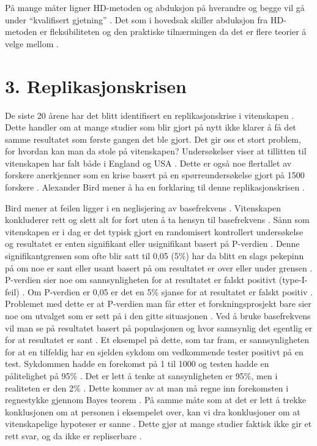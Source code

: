 \documentclass[
]{book}
\begin{document}
På mange måter ligner HD-metoden og abduksjon på hverandre og begge vil gå under ``kvalifisert gjetning'' \citep{persson2019}. Det som i hovedsak skiller abduksjon fra HD-metoden er fleksibiliteten og den praktiske tilnærmingen da det er flere teorier å velge mellom \citep{peirce1992}.

\hypertarget{replikasjonskrisen}{%
\section{3. Replikasjonskrisen}\label{replikasjonskrisen}}

De siste 20 årene har det blitt identifisert en replikasjonskrise i vitenskapen \citep{begley2012, ioannidis2005, opensciencecollaboration2015}. Dette handler om at mange studier som blir gjort på nytt ikke klarer å få det samme resultatet som første gangen det ble gjort. Det gir oss et stort problem, for hvordan kan man da stole på vitenskapen? Undersøkelser viser at tillitten til vitenskapen har falt både i England og USA \citep{funk2016}. Dette er også noe flertallet av forskere anerkjenner som en krise basert på en spørreundersøkelse gjort på 1500 forskere \citep{baker2016}. Alexander Bird mener å ha en forklaring til denne replikasjonskrisen \citep{bird2020}.

Bird mener at feilen ligger i en neglisjering av basefrekvens \citep{bird2020}. Vitenskapen konkluderer rett og slett alt for fort uten å ta hensyn til basefrekvens \citep{bird2020}. Sånn som vitenskapen er i dag er det typisk gjort en randomisert kontrollert undersøkelse og resultatet er enten signifikant eller usignifikant basert på P-verdien \citep{bird2020}. Denne signifikantgrensen som ofte blir satt til 0,05 (5\%) har da blitt en slags pekepinn på om noe er sant eller usant basert på om resultatet er over eller under grensen \citep{bird2020}. P-verdien sier noe om sannsynligheten for at resultatet er falskt positivt (type-I-feil) \citep{bird2020}. Om P-verdien er 0,05 er det en 5\% sjanse for at resultatet er falskt positiv \citep{bird2020}. Problemet med dette er at P-verdien man får etter et forskningsprosjekt bare sier noe om utvalget som er sett på i den gitte situasjonen \citep{bird2020}. Ved å bruke basefrekvens vil man se på resultatet basert på populasjonen og hvor sannsynlig det egentlig er for at resultatet er sant \citep{bird2020}. Et eksempel på dette, som \citet{bird2020} tar fram, er sannsynligheten for at en tilfeldig har en sjelden sykdom om vedkommende tester positivt på en test. Sykdommen hadde en forekomst på 1 til 1000 og testen hadde en pålitelighet på 95\% \citep{bird2020}. Det er lett å tenke at sansynligheten er 95\%, men i realiteten er den 2\% \citep{bird2020}. Dette kommer av at man må regne inn forekomsten i regnestykke gjennom Bayes teorem \citep{bird2020}. På samme måte som at det er lett å trekke konklusjonen om at personen i eksempelet over, kan vi dra konklusjoner om at vitenskapelige hypoteser er sanne \citep{bird2020}. Dette gjør at mange studier faktisk ikke gir et rett svar, og da ikke er repliserbare \citep{bird2020}.
\end{document}

